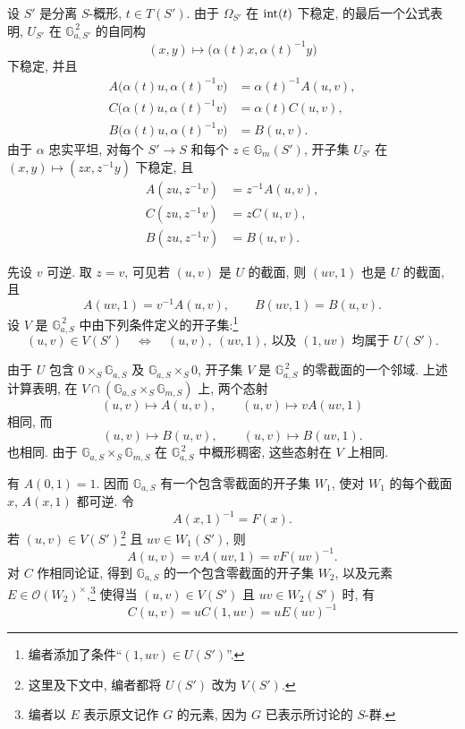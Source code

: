 设 \(S'\) 是分离 \(S\)-概形, \(t\in T(S')\). 由于 \(\Omega_{S'}\) 在 \(\operatorname{int}(t)\) 下稳定,  的最后一个公式表明, \(U_{S'}\) 在 \(\mathbb G_{a,S'}^{\,2}\) 的自同构
\[
  (x,y)\longmapsto
    \bigl(\alpha(t)x,\alpha(t)^{-1}y\bigr)
\]
下稳定, 并且
\[
\begin{aligned}
 A\bigl(\alpha(t)u,\alpha(t)^{-1}v\bigr)
   &=\alpha(t)^{-1}A(u,v),\\
 C\bigl(\alpha(t)u,\alpha(t)^{-1}v\bigr)
   &=\alpha(t)C(u,v),\\
 B\bigl(\alpha(t)u,\alpha(t)^{-1}v\bigr)
   &=B(u,v).
\end{aligned}
\]
由于 \(\alpha\) 忠实平坦, 对每个 \(S'\to S\) 和每个 \(z\in\mathbb G_m(S')\), 开子集 \(U_{S'}\) 在 \((x,y)\mapsto(zx,z^{-1}y)\) 下稳定, 且
\[
\begin{aligned}
  A(zu,z^{-1}v)&=z^{-1}A(u,v),\\
  C(zu,z^{-1}v)&=zC(u,v),\\
  B(zu,z^{-1}v)&=B(u,v).
\end{aligned}
\]

先设 \(v\) 可逆. 取 \(z=v\), 可见若 \((u,v)\) 是 \(U\) 的截面, 则 \((uv,1)\) 也是 \(U\) 的截面, 且
\[
  A(uv,1)=v^{-1}A(u,v),\qquad
  B(uv,1)=B(u,v).
\]
设 \(V\) 是 \(\mathbb G_{a,S}^{\,2}\) 中由下列条件定义的开子集:\footnote{编者添加了条件“\((1,uv)\in U(S')\)”.}
\[
  (u,v)\in V(S')
  \quad\Longleftrightarrow\quad
  (u,v),\ (uv,1),\ \text{以及 }(1,uv)\text{ 均属于 }U(S').
\]

由于 \(U\) 包含 \(0\times_S\mathbb G_{a,S}\) 及 \(\mathbb G_{a,S}\times_S0\), 开子集 \(V\) 是 \(\mathbb G_{a,S}^{\,2}\) 的零截面的一个邻域. 上述计算表明, 在 \(V\cap(\mathbb G_{a,S}\times_S\mathbb G_{m,S})\) 上, 两个态射
\[
  (u,v)\longmapsto A(u,v),\qquad
  (u,v)\longmapsto vA(uv,1)
\]
相同, 而
\[
  (u,v)\longmapsto B(u,v),\qquad
  (u,v)\longmapsto B(uv,1).
\]
也相同. 由于 \(\mathbb G_{a,S}\times_S\mathbb G_{m,S}\) 在 \(\mathbb G_{a,S}^{\,2}\) 中概形稠密, 这些态射在 \(V\) 上相同.

有 \(A(0,1)=1\). 因而 \(\mathbb G_{a,S}\) 有一个包含零截面的开子集 \(W_1\), 使对 \(W_1\) 的每个截面 \(x\), \(A(x,1)\) 都可逆. 令
\[
  A(x,1)^{-1}=F(x).
\]
若 \((u,v)\in V(S')\)\footnote{这里及下文中, 编者都将 \(U(S')\) 改为 \(V(S')\).} 且 \(uv\in W_1(S')\), 则
\[
  A(u,v)=vA(uv,1)=vF(uv)^{-1}.
\]
对 \(C\) 作相同论证, 得到 \(\mathbb G_{a,S}\) 的一个包含零截面的开子集 \(W_2\), 以及元素 \(E\in\mathscr O(W_2)^\times\),\footnote{编者以 \(E\) 表示原文记作 \(G\) 的元素, 因为 \(G\) 已表示所讨论的 \(S\)-群.} 使得当 \((u,v)\in V(S')\) 且 \(uv\in W_2(S')\) 时, 有
\[
  C(u,v)=uC(1,uv)=uE(uv)^{-1}
\]

